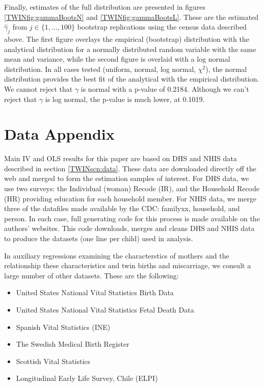 Finally, estimates of the full distribution are presented in figures 
\ref{TWINfig:gammaBootsN} and \ref{TWINfig:gammaBootsL}.  These are
the estimated $\hat\gamma_j$ from $j \in \{1,\ldots,100\}$ bootstrap 
replications using the census data described above.  The first figure 
overlays the empirical (bootstrap) distribution with the analytical 
distribution for a normally distributed random variable with the same mean 
and variance, while the second figure is overlaid with a log normal 
distribution.  In all cases tested (uniform, normal, log normal, $\chi^2$), 
the normal distribution provides the best fit of the analytical with the 
empirical distribution. We cannot reject that $\gamma$ is normal with a 
p-value of 0.2184.  Although we can't reject that $\gamma$ is log normal, 
the p-value is much lower, at 0.1019.


\section{Data Appendix}
\label{TWINscn:dataApp}
Main IV and OLS results for this paper are based on DHS and NHIS data described 
in section \ref{TWINscn:data}.  These data are downloaded directly off the web 
and merged to form the estimation samples of interest. For DHS data, we use two 
surveys: the Individual (woman) Recode (IR), and the Household Recode (HR) 
providing education for each household member.  For NHIS data, we merge three 
of the datafiles made available by the CDC: familyxx, household, and person.
In each case, full generating code for this process is made available on the
authors' websites.  This code downloads, merges and cleans DHS and NHIS data to
produce the datasets (one line per child) used in analysis.

In auxiliary regressions examining the characterstics of mothers and the 
relationship these characteristics and twin births and miscarriage, we consult
a large number of other datasets.  These are the following:
\begin{itemize}
\item United States National Vital Statistics Birth Data
\item United States National Vital Statistics Fetal Death Data
\item Spanish Vital Statistics (INE)
\item The Swedish Medical Birth Register
\item Scottish Vital Statistics
\item Longitudinal Early Life Survey, Chile (ELPI) 
\end{itemize}

